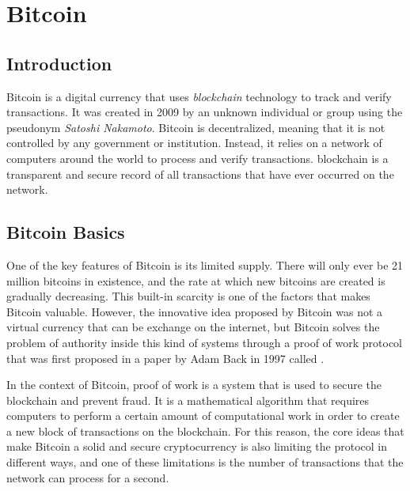 \newcommand{\noteOnBitcoinNaming}[0]{\footnote{
        From now till the end of the document we will use the word Bitcoin Protocol and
        Bitcoin with capitalized to identify the protocol, and the word bitcoin not capitalized to identify the currency
    }
}

\setcounter{page}{1}
\chapter{Bitcoin}

\section{Introduction}

Bitcoin is a digital currency that uses \emph{blockchain} technology to track
and verify transactions. It was created in 2009 by an unknown individual or
group using the pseudonym \emph{Satoshi Nakamoto}.
Bitcoin is decentralized, meaning that it is not controlled by any government
or institution. Instead, it relies on a network of computers around the world
to process and verify transactions.
blockchain is a transparent and secure record of all transactions that have
ever occurred on the network.

\section{Bitcoin Basics}
\label{sec:basics}

One of the key features of Bitcoin is its limited supply. There will only ever
be 21 million bitcoins in existence, and the rate at which new bitcoins are
created is gradually decreasing. This built-in scarcity is one of the factors
that makes Bitcoin valuable.
However, the innovative idea proposed by Bitcoin was not a virtual currency that can be
exchange on the internet, but Bitcoin solves the problem of authority inside this kind
of systems through a proof of work protocol that was first proposed in a paper
by Adam Back in 1997 called  \cite{hashcash}.

In the context of Bitcoin, proof of work is a system that is used to secure the
blockchain and prevent fraud. It is a mathematical algorithm that requires computers
to perform a certain amount of computational work in order to create a new
block of transactions on the blockchain.
For this reason, the core ideas that make Bitcoin a solid and secure cryptocurrency 
is also limiting the protocol in different ways, and one of these limitations is the number of
transactions that the network can process for a second.

